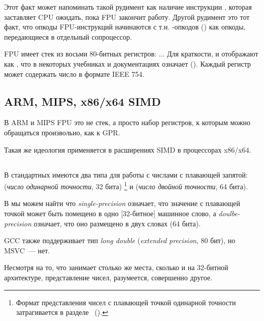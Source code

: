 Этот факт может напоминать такой рудимент как наличие инструкции , которая заставляет
\ac{CPU} ожидать, пока \ac{FPU} закончит работу.
Другой рудимент это тот факт, что опкоды \ac{FPU}-инструкций начинаются с т.н. -опкодов 
() как опкоды, передающиеся в отдельный сопроцессор.

\label{FPU_is_stack}
FPU имеет стек из восьми 80-битных регистров: ...
Для краткости, \IDA и \olly отображают  как ,
что в некоторых учебниках и документациях означает  ().
Каждый регистр может содержать число в формате IEEE 754\FNURLIEEE.

\subsection{ARM, MIPS, x86/x64 SIMD}

В ARM и MIPS FPU это не стек, а просто набор регистров, к которым можно обращаться произвольно, как к \ac{GPR}.

Такая же идеология применяется в расширениях SIMD в процессорах x86/x64.

\subsection{\CCpp}

В стандартных \CCpp имеются два типа для работы с числами с плавающей запятой: 
\Tfloat (\emph{число одинарной точности}\FNURLSP, 32 бита)
\footnote{Формат представления чисел с плавающей точкой одинарной точности затрагивается в разделе 
\emph{\WorkingWithFloatAsWithStructSubSubSectionName}~().}
и \Tdouble (\emph{число двойной точности}\FNURLDP, 64 бита).

В  мы можем найти что \emph{single-precision} означает, что значение с плавающей точкой может быть
помещено в одно [32-битное] машинное слово, а \emph{doulbe-precision} означает, что оно размещено в двух словах (64 бита).

GCC также поддерживает тип \emph{long double} (\emph{extended precision}\FNURLEP, 80 бит), но MSVC~--- нет.

Несмотря на то, что \Tfloat занимает столько же места, сколько и \Tint на 32-битной архитектуре, 
представление чисел, разумеется, совершенно другое.





